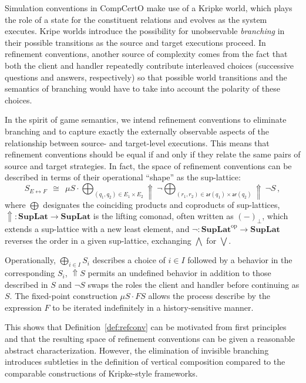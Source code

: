 \documentclass[acmsmall,nonacm]{acmart}
\newcommand{\kw}[1]{\ensuremath{ \mathsf{#1} }}
\begin{document}
Simulation conventions in CompCertO \cite{compcerto} make use of a Kripke world,
which plays the role of a state for the constituent relations
and evolves as the system executes.
Kripe worlds introduce the possibility for unobservable \emph{branching}
in their possible transitions
as the source and target executions proceed.
In refinement conventions,
another source of complexity
comes from the fact that
both the client and handler
repeatedly contribute interleaved choices
(successive questions and answers, respectively)
so that possible world transitions and the semantics of branching
would have to take into account the polarity of these choices.

In the spirit of game semantics,
we intend refinement conventions to eliminate branching
and to capture exactly the externally observable aspects
of the relationship between source- and target-level executions.
This means that refinement conventions should be equal
if and only if
they relate the same pairs of source and target strategies.
In fact,
the space of refinement conventions
can be described in terms of their operational ``shape''
as the sup-lattice:
\begin{equation} \label{eqn:refconfc}
  S_{E \leftrightarrow F} \:\:\cong\:\:
  \mu S \cdot
    \bigoplus_{(q_1, q_2) \in E_1 \times E_2}
    {\Uparrow}\:
    \lnot
    \bigoplus_{(r_1, r_2) \in \kw{ar}(q_1) \times \kw{ar}(q_2)}
    {\Uparrow}\:
    \lnot
    S
  \,,
\end{equation}
where
$\bigoplus$ designates the coinciding products and coproducts of sup-lattices,
${\Uparrow} : \mathbf{SupLat} \rightarrow \mathbf{SupLat}$
is the lifting comonad,
often written as $(-)_\bot$,
which extends a sup-lattice with a new least element,
and
${\lnot} : \mathbf{SupLat}^\mathrm{op} \rightarrow \mathbf{SupLat}$
reverses the order in a given sup-lattice,
exchanging $\bigwedge$ for $\bigvee$.

Operationally,
$\bigoplus_{i \in I} S_i$ describes a choice of $i \in I$
followed by a behavior in the corresponding $S_i$,
$\Uparrow S$ permits an undefined behavior
in addition to those described in $S$
and
$\lnot S$ swaps the roles the client and handler
before continuing as $S$.
The fixed-point construction $\mu S \cdot F S$
allows the process describe by the expression $F$
to be iterated indefinitely in a history-sensitive manner.

This shows that Definition~\ref{def:refconv}
can be motivated from first principles
and that the resulting space of refinement conventions
can be given a reasonable abstract characterization.
However,
the elimination of invisible branching
introduces subtleties in the definition of vertical composition 
compared to the comparable constructions
of Kripke-style frameworks.
\end{document}

